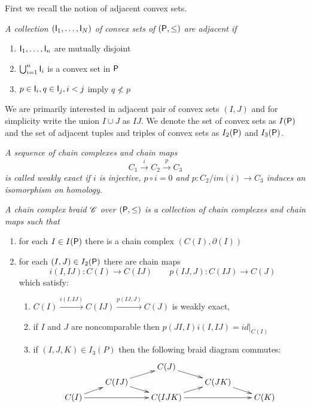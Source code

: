 First we recall the notion of adjacent convex sets.

\begin{defn}
{\em
A collection $({\mathsf I}_1,\ldots, {\mathsf I}_N)$ of convex sets of $({\mathsf P},\leq)$ are {\em adjacent} if
\begin{enumerate}
\item ${\mathsf I}_1,\ldots,{\mathsf I}_n$ are mutually disjoint
\item $\bigcup_{i=1}^n {\mathsf I}_i$ is a convex set in ${\mathsf P}$
\item $p\in {\mathsf I}_i, q\in {\mathsf I}_j, i < j$ imply $q \nless p$
\end{enumerate}
}
\end{defn}

We are primarily interested in adjacent pair of convex sets $(I,J)$ and for simplicity write the union $I\cup J$ as $IJ$.  
We denote the set of convex sets as $I({\mathsf P})$ and the set of adjacent tuples and triples of convex sets as $I_2({\mathsf P})$ and $I_3({\mathsf P})$.  




\begin{defn}
{\em
A sequence of chain complexes and chain maps $$C_1\xrightarrow{i} C_2 \xrightarrow{p} C_3$$
is called {\em weakly exact} if $i$ is injective, $p\circ i = 0$ and $p\colon C_2/im(i)\to C_3$ induces an isomorphism on homology.
}
\end{defn}

\begin{defn}
{\em
A {\em chain complex braid} $\mathscr{C}$ over $({\mathsf P},\leq)$ is a collection of chain complexes and chain maps such that
\begin{enumerate}
\item for each $I\in I({\mathsf P})$ there is a chain complex $(C(I),\partial(I))$
\item for each $(I,J)\in I_2({\mathsf P})$ there are chain maps $$i(I,IJ)\colon C(I)\to C(IJ)\quad\quad p(IJ,J)\colon C(IJ)\to C(J)$$ which satisfy:
\begin{enumerate}
\item $C(I)\xrightarrow{i(I,IJ)} C(IJ)\xrightarrow{p(IJ,J)} C(J)$ is weakly exact,
\item if $I$ and $J$ are noncomparable then $p(JI,I)i(I,IJ)=id|_{C(I)}$
\item if $(I,J,K)\in I_3(P)$ then the following braid diagram commutes:
\[
\xymatrixrowsep{0.03in}
\xymatrixcolsep{0.3in}
\xymatrix{
& & C(J) \ar[dr] & &  \\
& C(IJ) \ar[ur] \ar[dr] & & C(JK) \ar[dr] &  \\
C(I) \ar[ur] \ar[rr]& & C(IJK) \ar[rr] \ar[ur]& & C(K) 
}
\]
\end{enumerate}

\end{enumerate}
}
\end{defn}

